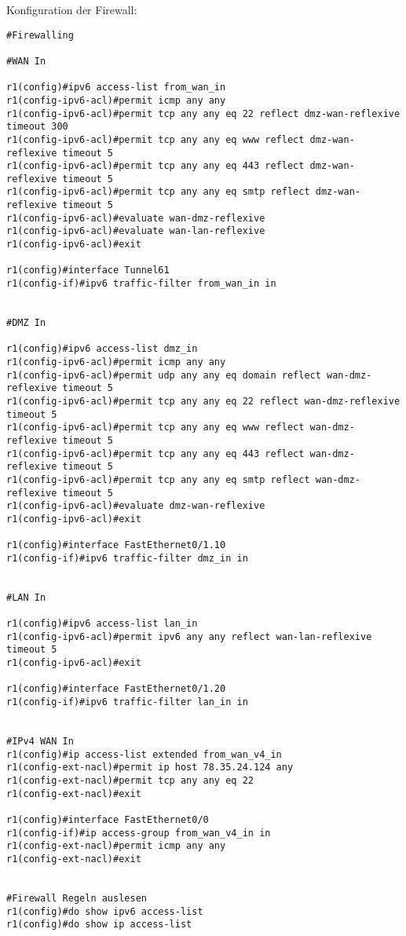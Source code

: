 Konfiguration der Firewall:
\begin{lstlisting}[numbers=none]
#Firewalling

#WAN In

r1(config)#ipv6 access-list from_wan_in
r1(config-ipv6-acl)#permit icmp any any
r1(config-ipv6-acl)#permit tcp any any eq 22 reflect dmz-wan-reflexive timeout 300
r1(config-ipv6-acl)#permit tcp any any eq www reflect dmz-wan-reflexive timeout 5
r1(config-ipv6-acl)#permit tcp any any eq 443 reflect dmz-wan-reflexive timeout 5
r1(config-ipv6-acl)#permit tcp any any eq smtp reflect dmz-wan-reflexive timeout 5
r1(config-ipv6-acl)#evaluate wan-dmz-reflexive
r1(config-ipv6-acl)#evaluate wan-lan-reflexive
r1(config-ipv6-acl)#exit

r1(config)#interface Tunnel61
r1(config-if)#ipv6 traffic-filter from_wan_in in


#DMZ In

r1(config)#ipv6 access-list dmz_in
r1(config-ipv6-acl)#permit icmp any any
r1(config-ipv6-acl)#permit udp any any eq domain reflect wan-dmz-reflexive timeout 5
r1(config-ipv6-acl)#permit tcp any any eq 22 reflect wan-dmz-reflexive timeout 5
r1(config-ipv6-acl)#permit tcp any any eq www reflect wan-dmz-reflexive timeout 5
r1(config-ipv6-acl)#permit tcp any any eq 443 reflect wan-dmz-reflexive timeout 5
r1(config-ipv6-acl)#permit tcp any any eq smtp reflect wan-dmz-reflexive timeout 5
r1(config-ipv6-acl)#evaluate dmz-wan-reflexive
r1(config-ipv6-acl)#exit

r1(config)#interface FastEthernet0/1.10
r1(config-if)#ipv6 traffic-filter dmz_in in


#LAN In

r1(config)#ipv6 access-list lan_in
r1(config-ipv6-acl)#permit ipv6 any any reflect wan-lan-reflexive timeout 5
r1(config-ipv6-acl)#exit

r1(config)#interface FastEthernet0/1.20
r1(config-if)#ipv6 traffic-filter lan_in in


#IPv4 WAN In
r1(config)#ip access-list extended from_wan_v4_in
r1(config-ext-nacl)#permit ip host 78.35.24.124 any
r1(config-ext-nacl)#permit tcp any any eq 22
r1(config-ext-nacl)#exit

r1(config)#interface FastEthernet0/0
r1(config-if)#ip access-group from_wan_v4_in in
r1(config-ext-nacl)#permit icmp any any
r1(config-ext-nacl)#exit


#Firewall Regeln auslesen
r1(config)#do show ipv6 access-list
r1(config)#do show ip access-list
\end{lstlisting}
